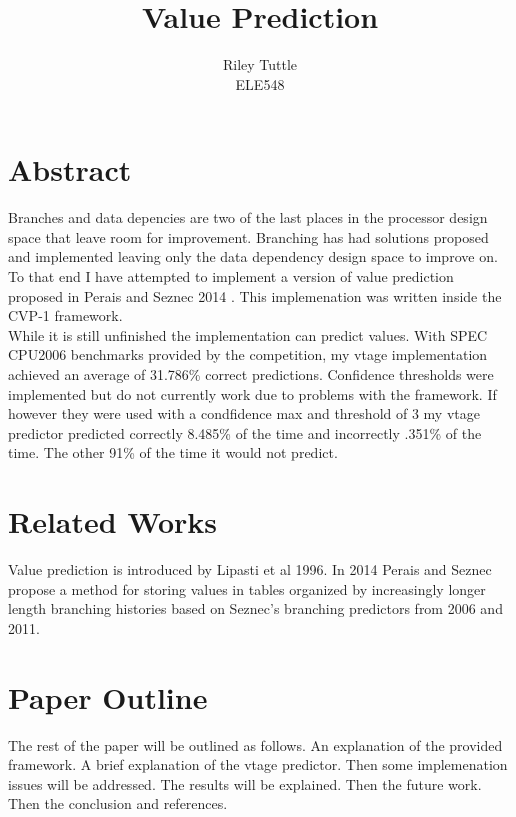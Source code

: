 \documentclass[12pt]{article}
\newcommand\tab[1][1cm]{\hspace*{#1}}
\begin{document}
\title{Value Prediction}
\author{Riley Tuttle\\
ELE548}
\renewcommand{\today}{May 4, 2018}
\maketitle
\begin{multicols}{2}
\section{Abstract}
\tab Branches and data depencies are two of the last places in the processor design space that leave room for improvement. Branching has had solutions proposed and implemented leaving only the data dependency design space to improve on. To that end I have attempted to implement a version of value prediction proposed in Perais and Seznec 2014 \cite{Seznec2014}. This implemenation was written inside the CVP-1 framework.\\
\tab While it is still unfinished the implementation can predict values. With SPEC CPU2006 benchmarks provided by the competition, my vtage implementation achieved an average of 31.786\% correct predictions. Confidence thresholds were implemented but do not currently work due to problems with the framework. If however they were used with a condfidence max and threshold of 3 my vtage predictor predicted correctly 8.485\% of the time and incorrectly .351\% of the time. The other 91\% of the time it would not predict.
\section{Related Works}
\tab Value prediction is introduced by Lipasti et al 1996. In 2014 Perais and Seznec propose a method for storing values in tables organized by increasingly longer length branching histories based on Seznec's branching predictors from 2006 and 2011.
\section{Paper Outline}
\tab The rest of the paper will be outlined as follows. An explanation of the provided framework. A brief explanation of the vtage predictor. Then some implemenation issues will be addressed. The results will be explained. Then the future work. Then the conclusion and references.

\end{multicols}
\end{document}

